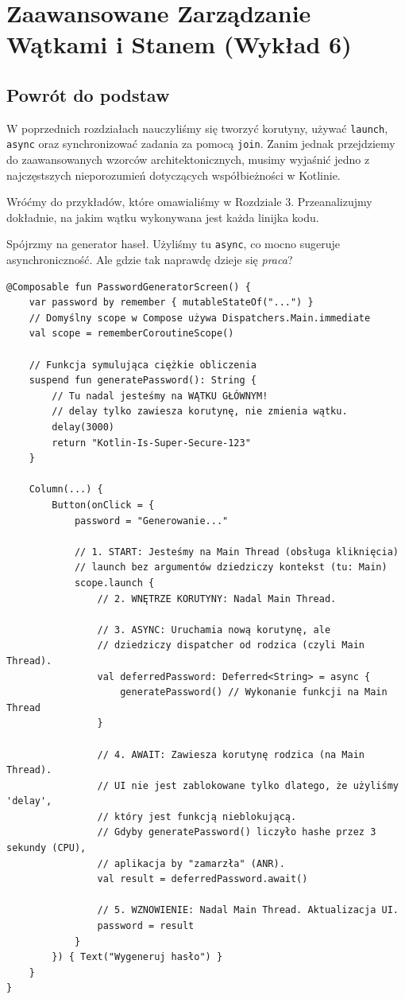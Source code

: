\chapter{Zaawansowane Zarządzanie Wątkami i Stanem (Wykład 6)}

\section{Powrót do podstaw}

W poprzednich rozdziałach nauczyliśmy się tworzyć korutyny, używać \texttt{launch}, \texttt{async} oraz synchronizować zadania za pomocą \texttt{join}. Zanim jednak przejdziemy do zaawansowanych wzorców architektonicznych, musimy wyjaśnić jedno z najczęstszych nieporozumień dotyczących współbieżności w Kotlinie.

Wróćmy do przykładów, które omawialiśmy w Rozdziale 3. Przeanalizujmy dokładnie, na jakim wątku wykonywana jest każda linijka kodu.

Spójrzmy na generator haseł. Użyliśmy tu \texttt{async}, co mocno sugeruje asynchroniczność. Ale gdzie tak naprawdę dzieje się \textit{praca}?

\begin{verbatim}
@Composable fun PasswordGeneratorScreen() { 
    var password by remember { mutableStateOf("...") } 
    // Domyślny scope w Compose używa Dispatchers.Main.immediate
    val scope = rememberCoroutineScope()

    // Funkcja symulująca ciężkie obliczenia
    suspend fun generatePassword(): String {
        // Tu nadal jesteśmy na WĄTKU GŁÓWNYM!
        // delay tylko zawiesza korutynę, nie zmienia wątku.
        delay(3000) 
        return "Kotlin-Is-Super-Secure-123"
    }

    Column(...) {
        Button(onClick = {
            password = "Generowanie..."
            
            // 1. START: Jesteśmy na Main Thread (obsługa kliknięcia)
            // launch bez argumentów dziedziczy kontekst (tu: Main)
            scope.launch { 
                // 2. WNĘTRZE KORUTYNY: Nadal Main Thread.
                
                // 3. ASYNC: Uruchamia nową korutynę, ale
                // dziedziczy dispatcher od rodzica (czyli Main Thread).
                val deferredPassword: Deferred<String> = async { 
                    generatePassword() // Wykonanie funkcji na Main Thread
                }
                
                // 4. AWAIT: Zawiesza korutynę rodzica (na Main Thread).
                // UI nie jest zablokowane tylko dlatego, że użyliśmy 'delay',
                // który jest funkcją nieblokującą.
                // Gdyby generatePassword() liczyło hashe przez 3 sekundy (CPU), 
                // aplikacja by "zamarzła" (ANR).
                val result = deferredPassword.await()
                
                // 5. WZNOWIENIE: Nadal Main Thread. Aktualizacja UI.
                password = result
            }
        }) { Text("Wygeneruj hasło") }
    }
} 
\end{verbatim}

